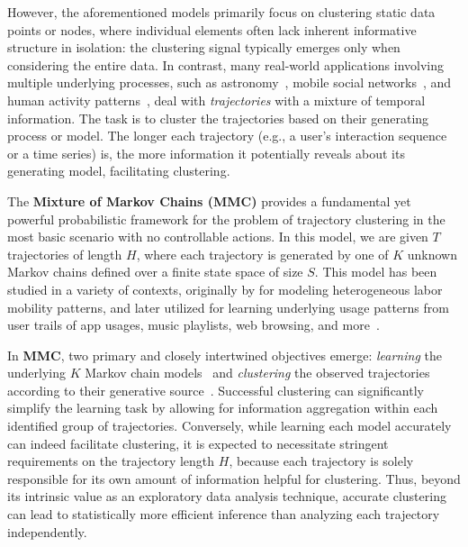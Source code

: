 \documentclass[twoside]{article}
\theoremstyle{plain}
\begin{document}
However, the aforementioned models primarily focus on clustering static data points or nodes, where individual elements often lack inherent informative structure in isolation: the clustering signal typically emerges only when considering the entire data.
In contrast, many real-world applications involving multiple underlying processes, such as astronomy~\citep{yang2020trajectory}, mobile social networks~\citep{tang2021trajectory}, and human activity patterns~\citep{zhou2021human}, deal with \textit{trajectories} with a mixture of temporal information.
The task is to cluster the trajectories based on their generating process or model.
The longer each trajectory (e.g., a user's interaction sequence or a time series) is, the more information it potentially reveals about its generating model, facilitating clustering.


The \textbf{Mixture of Markov Chains (MMC)} provides a fundamental yet powerful probabilistic framework for the problem of trajectory clustering in the most basic scenario with no controllable actions.
In this model, we are given $T$ trajectories of length $H$, where each trajectory is generated by one of $K$ unknown Markov chains defined over a finite state space of size $S$.
This model has been studied in a variety of contexts, originally by \citet{blumen1955industrial} for modeling heterogeneous labor mobility patterns, and later utilized for learning underlying usage patterns from user trails of app usages, music playlists, web browsing, and more~\citep{gupta2016mixture,spaeh2023mixture,maystre2022mmc,cadez2003mmc,poulsen1990mmc,girolami2003mmc,zhou2021human}.





In \textbf{MMC}, two primary and closely intertwined objectives emerge: \textit{learning} the underlying $K$ Markov chain models~\citep{gupta2016mixture,spaeh2023mixture,kausik2023mixture} and \textit{clustering} the observed trajectories according to their generative source~\citep{kausik2023mixture}.
Successful clustering can significantly simplify the learning task by allowing for information aggregation within each identified group of trajectories. 
Conversely, while learning each model accurately can indeed facilitate clustering, it is expected to necessitate stringent requirements on the trajectory length $H$, because each trajectory is solely responsible for its own amount of information helpful for clustering.
Thus, beyond its intrinsic value as an exploratory data analysis technique, accurate clustering can lead to statistically more efficient inference than analyzing each trajectory independently.
\end{document}
